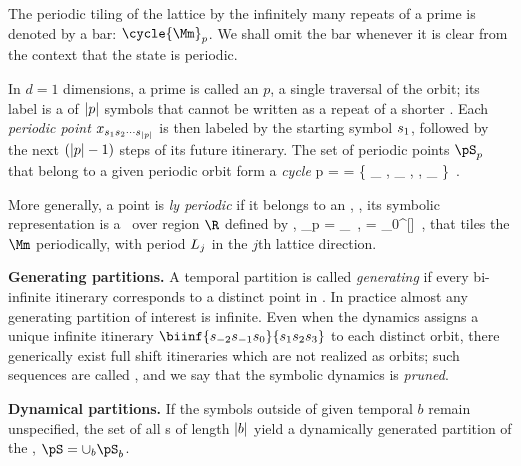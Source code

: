 The periodic tiling of the lattice by the infinitely many repeats of a prime
{\brick} is denoted by a bar: $\cycle{\Mm}_{p}$. We shall omit the bar whenever
it is clear from the context that the state is periodic.


In $d=1$ dimensions, a prime {\brick} is called an {\em \orbit} $p$, a
single traversal of the orbit; its label is a {\brick} of ${|p|}$ symbols that
cannot be written as a repeat of a shorter {\brick}.
Each {\em periodic point}
\(
      x_{ {s_{1}} {s_{2}} \cdots {\ensuremath{s_{{|p|}}}}}
\)
is then labeled by the starting symbol ${s_{1}}$, followed by
the next $({|p|}-1)$ steps of its future itinerary.
The set of periodic points $\pS_p$ that belong to a given periodic orbit
form a {\em cycle}
\beq
p =  
  = \{
      \ssp_{  \cdots {}},
      \ssp_{  \cdots {} },
    \cdots,
      \ssp_{  \cdots {}}
     \}
\,.

More generally, a {\statesp} point is {\em {\spt}ly periodic} if
it belongs to an \dtor, \ie, its symbolic representation is a \brick\
over region $\R$ defined by ,
\beq
  \Mm_{p} = \Mm_{\R}
  \,,\qquad
  \R = \R_{0}^{[\!\times\!\!\times\cdots\times\!]}
\,,
that
tiles the {\lattstate}  $\Mm$ periodically, with period ${L_{j}}$ in the
$j$th lattice direction.


{\bf Generating partitions.}
A temporal partition is called {\em generating} if every bi-infinite itinerary
corresponds to a distinct point in {\statesp}.
In practice almost any
generating partition of interest is infinite.
Even when the dynamics assigns a unique infinite itinerary
$\biinf{\Ssym{-2}\Ssym{-1}\Ssym{0}}{\Ssym{1}\Ssym{2} \Ssym{3}}$ to each
distinct orbit, there generically exist full shift itineraries
 which are not realized as orbits; such sequences are
called {\em \inadmissible}, and we say that the symbolic dynamics is {\em
pruned}.

{\bf Dynamical partitions.}
If the symbols outside of given temporal {\brick} $b$ remain unspecified, the
set of all {\admissible} {\brick s} of length ${|b|}$ yield a dynamically
generated partition of the \statesp, $\pS = \cup_b \pS_b$.

